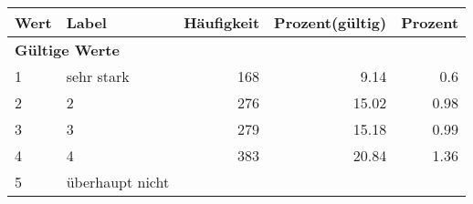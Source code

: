      \begin{longtable}{lXrrr}
     \toprule
     \textbf{Wert} & \textbf{Label} & \textbf{Häufigkeit} & \textbf{Prozent(gültig)} & \textbf{Prozent} \\
     \endhead
     \midrule
     \multicolumn{5}{l}{\textbf{Gültige Werte}}\\

     1 &
     \multicolumn{1}{X}{ sehr stark   } &


       \num{168} &
       \num[round-mode=places,round-precision=2]{9.14} &
         \num[round-mode=places,round-precision=2]{0.6} \\

     2 &
     \multicolumn{1}{X}{ 2   } &


       \num{276} &
       \num[round-mode=places,round-precision=2]{15.02} &
         \num[round-mode=places,round-precision=2]{0.98} \\

     3 &
     \multicolumn{1}{X}{ 3   } &


       \num{279} &
       \num[round-mode=places,round-precision=2]{15.18} &
         \num[round-mode=places,round-precision=2]{0.99} \\

     4 &
     \multicolumn{1}{X}{ 4   } &


       \num{383} &
       \num[round-mode=places,round-precision=2]{20.84} &
         \num[round-mode=places,round-precision=2]{1.36} \\

     5 &
     \multicolumn{1}{X}{ überhaupt nicht   } &



\end{longtable}
